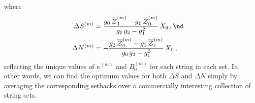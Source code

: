 where
\begin{subequations}%
  \begin{align}
    \Delta S^{(m)} &= \frac{g_0\, \overline{\mathcal{Z}}^{(m)}_1 - g_1\, \overline{\mathcal{Z}}^{(m)}_0}{g_0\, g_2 - g_1^2}\, X_0\, , \nd \\
    \Delta N^{(m)} &= -\frac{g_2\, \overline{\mathcal{Z}}^{(m)}_0 - g_1\, \overline{\mathcal{Z}}^{(m)}_1}{g_0\, g_2 - g_1^2}\, X_0\, ,
  \end{align}
\end{subequations}
reflecting the unique values of $\kappa^{(m)}$ and $B_0^{(m)}$ for each string in each set. In other words, we can find the optimum values for both $\Delta S$ and $\Delta N$ simply by averaging the corresponding setbacks over a commercially interesting collection of string sets. 